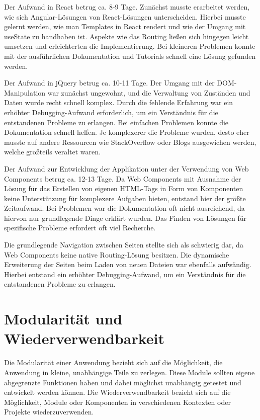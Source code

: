 \documentclass[oneside]{ausarbeitung}
\begin{document}
Der Aufwand in React betrug ca. 8-9 Tage. Zunächst musste erarbeitet werden, wie sich Angular-Lösungen von React-Lösungen unterscheiden. Hierbei musste gelernt werden, wie man Templates in React rendert und wie der Umgang mit useState zu handhaben ist. Aspekte wie das Routing ließen sich hingegen leicht umsetzen und erleichterten die Implementierung. Bei kleineren Problemen konnte mit der ausführlichen Dokumentation und Tutorials schnell eine Lösung gefunden werden.

Der Aufwand in jQuery betrug ca. 10-11 Tage. Der Umgang mit der DOM-Manipulation war zunächst ungewohnt, und die Verwaltung von Zuständen und Daten wurde recht schnell komplex. Durch die fehlende Erfahrung war ein erhöhter Debugging-Aufwand erforderlich, um ein Verständnis für die entstandenen Probleme zu erlangen. Bei einfachen Problemen konnte die Dokumentation schnell helfen. Je komplexerer die Probleme wurden, desto eher musste auf andere Ressourcen wie StackOverflow oder Blogs ausgewichen werden, welche großteils veraltet waren.  

Der Aufwand zur Entwicklung der Applikation unter der Verwendung von Web Components betrug ca. 12-13 Tage. Da Web Components mit Ausnahme der Lösung für das Erstellen von eigenen HTML-Tags in Form von Komponenten keine Unterstützung für komplexere Aufgaben bieten, entstand hier der größte Zeitaufwand. Bei Problemen war die Dokumentation oft nicht ausreichend, da hiervon nur grundlegende Dinge erklärt wurden. Das Finden von Lösungen für spezifische Probleme erfordert oft viel Recherche.

Die grundlegende Navigation zwischen Seiten stellte sich als schwierig dar, da Web Components keine native Routing-Lösung besitzen. Die dynamische Erweiterung der Seiten beim Laden von neuen Dateien war ebenfalls aufwändig. Hierbei entstand ein erhöhter Debugging-Aufwand, um ein Verständnis für die entstandenen Probleme zu erlangen.

\section{Modularität und Wiederverwendbarkeit}

Die Modularität einer Anwendung bezieht sich auf die Möglichkeit, die Anwendung in kleine, unabhängige Teile zu zerlegen. Diese Module sollten eigene abgegrenzte Funktionen haben und dabei möglichst unabhängig getestet und entwickelt werden können. 
Die Wiederverwendbarkeit bezieht sich auf die Möglichkeit, Module oder Komponenten in verschiedenen Kontexten oder Projekte wiederzuverwenden. 
\end{document}
